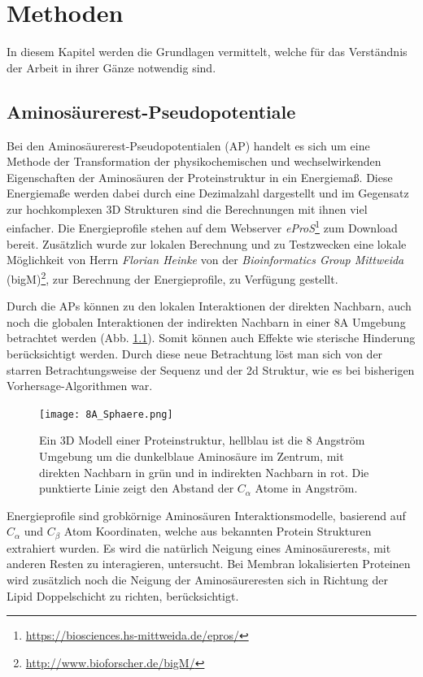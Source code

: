 \chapter{Methoden}

In diesem Kapitel werden die Grundlagen vermittelt, welche für das Verständnis der Arbeit in ihrer Gänze notwendig sind.

\section{Aminosäurerest-Pseudopotentiale}

Bei den Aminosäurerest-Pseudopotentialen (AP) handelt es sich um eine Methode der Transformation der physikochemischen und wechselwirkenden Eigenschaften der Aminosäuren der Proteinstruktur in ein Energiemaß. Diese Energiemaße werden dabei durch eine Dezimalzahl dargestellt und im Gegensatz zur hochkomplexen 3D Strukturen sind die Berechnungen mit ihnen viel einfacher. Die Energieprofile stehen auf dem Webserver \emph{eProS}\footnote{\url{https://biosciences.hs-mittweida.de/epros/}} zum Download bereit. Zusätzlich wurde zur lokalen Berechnung und zu Testzwecken eine lokale Möglichkeit von Herrn \emph{Florian Heinke} von der \emph{Bioinformatics Group Mittweida} (bigM)\footnote{\url{http://www.bioforscher.de/bigM/}}, zur Berechnung der Energieprofile, zu Verfügung gestellt.

Durch die APs können zu den lokalen Interaktionen der direkten Nachbarn, auch noch die globalen Interaktionen der indirekten Nachbarn in einer 8A Umgebung betrachtet werden (Abb. \ref{fig:8A_Sphaere}). Somit können auch Effekte wie sterische Hinderung berücksichtigt werden. Durch diese neue Betrachtung löst man sich von der starren Betrachtungsweise der Sequenz und der 2d Struktur, wie es bei bisherigen Vorhersage-Algorithmen war.
%
\begin{figure}
\centering
\texttt{[image: 8A\_Sphaere.png]}
\caption{Ein 3D Modell einer Proteinstruktur, hellblau ist die 8 Angström Umgebung um die dunkelblaue Aminosäure im Zentrum, mit direkten Nachbarn in grün und in indirekten Nachbarn in rot. Die punktierte Linie zeigt den Abstand der $C_{\alpha}$ Atome in Angström.}%
\label{fig:8A_Sphaere}
\end{figure}

Energieprofile sind grobkörnige Aminosäuren Interaktionsmodelle, basierend auf $C_{\alpha}$ und $C_{\beta}$ Atom Koordinaten, welche aus bekannten Protein Strukturen extrahiert wurden. Es wird die natürlich Neigung eines Aminosäurerests, mit anderen Resten zu interagieren, untersucht. Bei Membran lokalisierten Proteinen wird zusätzlich noch die Neigung der Aminosäureresten sich in Richtung der Lipid Doppelschicht zu richten, berücksichtigt. 

